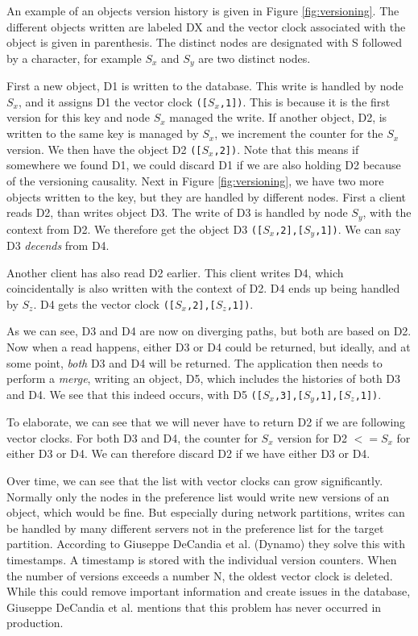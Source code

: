 An example of an objects version history is given in Figure \ref{fig:versioning}. 
The different objects written are labeled DX and the vector clock associated with the object is given in parenthesis. The distinct nodes are designated with S followed by a character, for example $S_x$ and $S_y$ are two distinct nodes.

First a new object, D1 is written to the database. This write is handled by node $S_x$, and it assigns D1 the vector clock \texttt{([$S_x$,1])}.
This is because it is the first version for this key and node $S_x$ managed the write. If another object, D2, is written to the same key is managed by $S_x$, we increment the counter for the $S_x$ version. We then have the object D2 \texttt{([$S_x$,2])}. Note that this means if somewhere we found D1, we could discard D1 if we are also holding D2 because of the versioning causality.
Next in Figure \ref{fig:versioning}, we have two more objects written to the key, but they are handled by different nodes.
First a client reads D2, than writes object D3. The write of D3 is handled by node $S_y$, with the context from D2. We therefore get the object D3 \texttt{([$S_x$,2],[$S_y$,1])}. We can say D3 \emph{decends} from D4.

Another client has also read D2 earlier. This client writes D4, which coincidentally is also written with the context of D2. D4 ends up being handled by $S_z$. D4 gets the vector clock \texttt{([$S_x$,2],[$S_z$,1])}.

As we can see, D3 and D4 are now on diverging paths, but both are based on D2.
Now when a read happens, either D3 or D4 could be returned, but ideally, and at some point, \emph{both} D3 and D4 will be returned.
The application then needs to perform a \emph{merge}, writing an object, D5, which includes the histories of both D3 and D4.
We see that this indeed occurs, with D5 \texttt{([$S_x$,3],[$S_y$,1],[$S_z$,1])}.

To elaborate, we can see that we will never have to return D2 if we are following vector clocks.
For both D3 and D4, the counter for $S_x$ version for D2 $<= S_x$ for either D3 or D4. We can therefore discard D2 if we have either D3 or D4.

Over time, we can see that the list with vector clocks can grow significantly. Normally only the nodes in the preference list would write new versions of an object, which would be fine. But especially during network partitions, writes can be handled by many different servers not in the preference list for the target partition.
According to Giuseppe DeCandia et al. (Dynamo)\cite{dynamo} they solve this with timestamps. A timestamp is stored with the individual version counters. 
When the number of versions exceeds a number N, the oldest vector clock is deleted.
While this could remove important information and create issues in the database, Giuseppe DeCandia et al.\cite{dynamo} mentions that this problem has never occurred in production.

